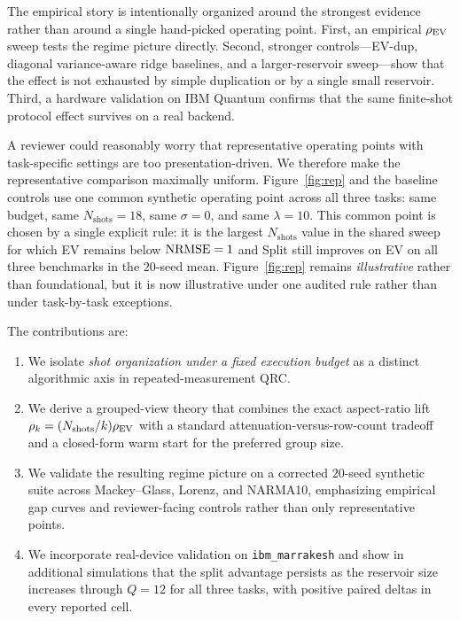 The empirical story is intentionally organized around the strongest evidence rather than around a single hand-picked operating point. First, an empirical $\rho_{\mathrm{EV}}$ sweep tests the regime picture directly. Second, stronger controls---EV-dup, diagonal variance-aware ridge baselines, and a larger-reservoir sweep---show that the effect is not exhausted by simple duplication or by a single small reservoir. Third, a hardware validation on IBM Quantum confirms that the same finite-shot protocol effect survives on a real backend.

A reviewer could reasonably worry that representative operating points with task-specific settings are too presentation-driven. We therefore make the representative comparison maximally uniform. Figure~\ref{fig:rep} and the baseline controls use one common synthetic operating point across all three tasks: same budget, same $N_{\mathrm{shots}}=18$, same $\sigma=0$, and same $\lambda=10$. This common point is chosen by a single explicit rule: it is the largest $N_{\mathrm{shots}}$ value in the shared sweep for which EV remains below $\mathrm{NRMSE}=1$ and Split still improves on EV on all three benchmarks in the $20$-seed mean. Figure~\ref{fig:rep} remains \emph{illustrative} rather than foundational, but it is now illustrative under one audited rule rather than under task-by-task exceptions.

The contributions are:
\begin{enumerate}[leftmargin=*,label=(\roman*)]
    \item We isolate \emph{shot organization under a fixed execution budget} as a distinct algorithmic axis in repeated-measurement QRC.
    \item We derive a grouped-view theory that combines the exact aspect-ratio lift $\rho_k=(N_{\mathrm{shots}}/k)\rho_{\mathrm{EV}}$ with a standard attenuation-versus-row-count tradeoff and a closed-form warm start for the preferred group size.
    \item We validate the resulting regime picture on a corrected $20$-seed synthetic suite across Mackey--Glass, Lorenz, and NARMA10, emphasizing empirical gap curves and reviewer-facing controls rather than only representative points.
    \item We incorporate real-device validation on \texttt{ibm\_marrakesh} and show in additional simulations that the split advantage persists as the reservoir size increases through $Q=12$ for all three tasks, with positive paired deltas in every reported cell.
\end{enumerate}

